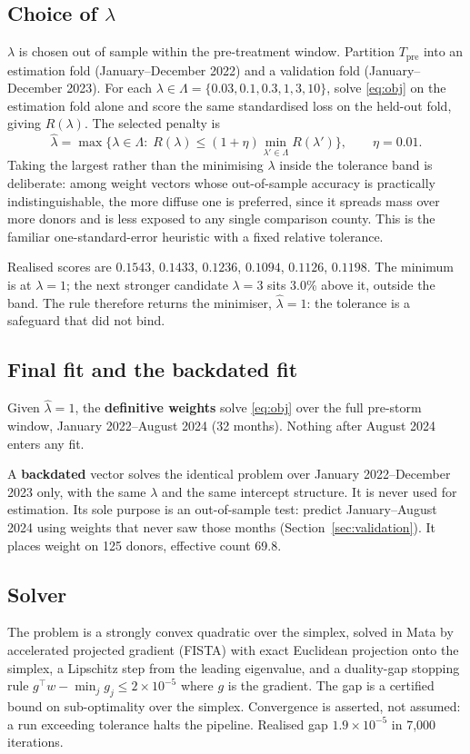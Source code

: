 \documentclass[11pt,a4paper]{article}
\begin{document}
\subsection{Choice of $\lambda$}
$\lambda$ is chosen out of sample within the pre-treatment window. Partition $T_{\text{pre}}$ into an
estimation fold (January--December 2022) and a validation fold (January--December 2023). For each
$\lambda\in\Lambda=\{0.03,0.1,0.3,1,3,10\}$, solve \eqref{eq:obj} on the estimation fold alone and
score the same standardised loss on the held-out fold, giving $R(\lambda)$. The selected penalty is
\begin{equation}
\widehat\lambda=\max\Big\{\lambda\in\Lambda:\;R(\lambda)\le(1+\eta)\min_{\lambda'\in\Lambda}R(\lambda')\Big\},\qquad\eta=0.01 .
\end{equation}
Taking the largest rather than the minimising $\lambda$ inside the tolerance band is deliberate: among
weight vectors whose out-of-sample accuracy is practically indistinguishable, the more diffuse one is
preferred, since it spreads mass over more donors and is less exposed to any single comparison county.
This is the familiar one-standard-error heuristic with a fixed relative tolerance.

Realised scores are $0.1543$, $0.1433$, $0.1236$, $0.1094$, $0.1126$, $0.1198$. The minimum is at
$\lambda=1$; the next stronger candidate $\lambda=3$ sits 3.0\% above it, outside the band. The rule
therefore returns the minimiser, $\widehat\lambda=1$: the tolerance is a safeguard that did not bind.

\subsection{Final fit and the backdated fit}
Given $\widehat\lambda=1$, the \textbf{definitive weights} solve \eqref{eq:obj} over the full pre-storm
window, January 2022--August 2024 (32 months). Nothing after August 2024 enters any fit.

A \textbf{backdated} vector solves the identical problem over January 2022--December 2023 only, with
the same $\lambda$ and the same intercept structure. It is never used for estimation. Its sole purpose
is an out-of-sample test: predict January--August 2024 using weights that never saw those months
(Section~\ref{sec:validation}). It places weight on 125 donors, effective count 69.8.

\subsection{Solver}
The problem is a strongly convex quadratic over the simplex, solved in Mata by accelerated projected
gradient (FISTA) with exact Euclidean projection onto the simplex, a Lipschitz step from the leading
eigenvalue, and a duality-gap stopping rule $g^\top w-\min_j g_j\le2\times10^{-5}$ where $g$ is the
gradient. The gap is a certified bound on sub-optimality over the simplex. Convergence is asserted,
not assumed: a run exceeding tolerance halts the pipeline. Realised gap $1.9\times10^{-5}$ in 7{,}000
iterations.
\end{document}
